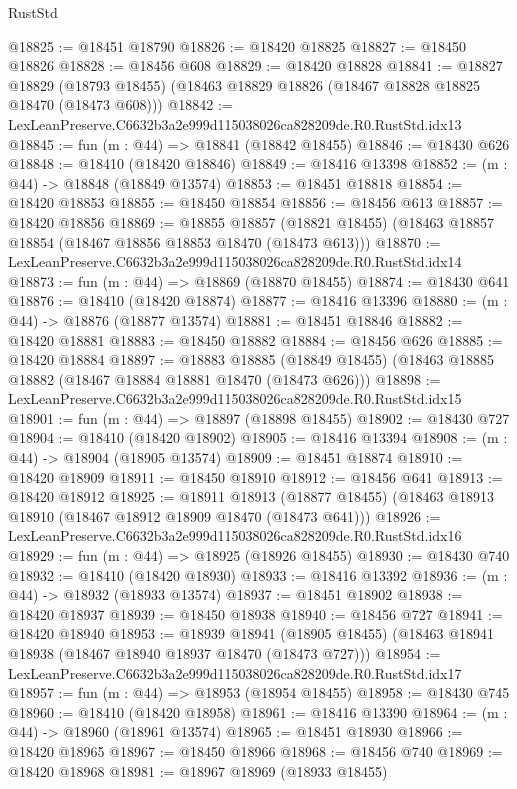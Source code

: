 \begin{lexlean}{RustStd}
\begin{coremodule}
@18825 := @18451 @18790
@18826 := @18420 @18825
@18827 := @18450 @18826
@18828 := @18456 @608
@18829 := @18420 @18828
@18841 := @18827
    @18829
    (@18793 @18455)
    (@18463 @18829 @18826 (@18467 @18828 @18825 @18470 (@18473 @608)))
@18842 := LexLeanPreserve.C6632b3a2e999d115038026ca828209de.R0.RustStd.idx13
@18845 := fun (m : @44) => @18841 (@18842 @18455)
@18846 := @18430 @626
@18848 := @18410 (@18420 @18846)
@18849 := @18416 @13398
@18852 := (m : @44) -> @18848 (@18849 @13574)
@18853 := @18451 @18818
@18854 := @18420 @18853
@18855 := @18450 @18854
@18856 := @18456 @613
@18857 := @18420 @18856
@18869 := @18855
    @18857
    (@18821 @18455)
    (@18463 @18857 @18854 (@18467 @18856 @18853 @18470 (@18473 @613)))
@18870 := LexLeanPreserve.C6632b3a2e999d115038026ca828209de.R0.RustStd.idx14
@18873 := fun (m : @44) => @18869 (@18870 @18455)
@18874 := @18430 @641
@18876 := @18410 (@18420 @18874)
@18877 := @18416 @13396
@18880 := (m : @44) -> @18876 (@18877 @13574)
@18881 := @18451 @18846
@18882 := @18420 @18881
@18883 := @18450 @18882
@18884 := @18456 @626
@18885 := @18420 @18884
@18897 := @18883
    @18885
    (@18849 @18455)
    (@18463 @18885 @18882 (@18467 @18884 @18881 @18470 (@18473 @626)))
@18898 := LexLeanPreserve.C6632b3a2e999d115038026ca828209de.R0.RustStd.idx15
@18901 := fun (m : @44) => @18897 (@18898 @18455)
@18902 := @18430 @727
@18904 := @18410 (@18420 @18902)
@18905 := @18416 @13394
@18908 := (m : @44) -> @18904 (@18905 @13574)
@18909 := @18451 @18874
@18910 := @18420 @18909
@18911 := @18450 @18910
@18912 := @18456 @641
@18913 := @18420 @18912
@18925 := @18911
    @18913
    (@18877 @18455)
    (@18463 @18913 @18910 (@18467 @18912 @18909 @18470 (@18473 @641)))
@18926 := LexLeanPreserve.C6632b3a2e999d115038026ca828209de.R0.RustStd.idx16
@18929 := fun (m : @44) => @18925 (@18926 @18455)
@18930 := @18430 @740
@18932 := @18410 (@18420 @18930)
@18933 := @18416 @13392
@18936 := (m : @44) -> @18932 (@18933 @13574)
@18937 := @18451 @18902
@18938 := @18420 @18937
@18939 := @18450 @18938
@18940 := @18456 @727
@18941 := @18420 @18940
@18953 := @18939
    @18941
    (@18905 @18455)
    (@18463 @18941 @18938 (@18467 @18940 @18937 @18470 (@18473 @727)))
@18954 := LexLeanPreserve.C6632b3a2e999d115038026ca828209de.R0.RustStd.idx17
@18957 := fun (m : @44) => @18953 (@18954 @18455)
@18958 := @18430 @745
@18960 := @18410 (@18420 @18958)
@18961 := @18416 @13390
@18964 := (m : @44) -> @18960 (@18961 @13574)
@18965 := @18451 @18930
@18966 := @18420 @18965
@18967 := @18450 @18966
@18968 := @18456 @740
@18969 := @18420 @18968
@18981 := @18967
    @18969
    (@18933 @18455)

\end{coremodule}
\end{lexlean}

